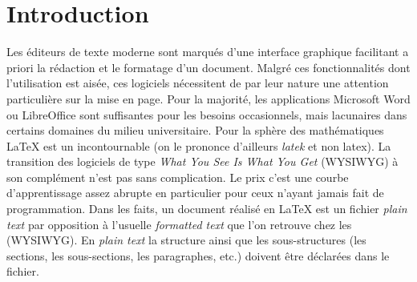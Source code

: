 \twocolumn
	\section*{Introduction}
	Les éditeurs de texte \og moderne\fg{} sont marqués d'une interface graphique facilitant a priori la rédaction et le formatage d'un document. Malgré ces fonctionnalités dont l'utilisation est aisée, ces logiciels nécessitent de par leur nature une attention particulière sur la mise en page. Pour la majorité, les applications Microsoft Word ou LibreOffice sont suffisantes pour les besoins occasionnels, mais lacunaires dans certains domaines du milieu universitaire. Pour la sphère des mathématiques \LaTeX{} est un incontournable (on le prononce d'ailleurs \og \textit{latek}\fg{} et non latex). La transition des logiciels de type \emph{What You See Is What You Get} (WYSIWYG) à son complément n'est pas sans complication. Le prix c'est une courbe d'apprentissage assez abrupte en particulier pour ceux n'ayant jamais fait de programmation. Dans les faits, un document réalisé en \LaTeX{} est un fichier \emph{plain text} par opposition à l'usuelle \emph{formatted text} que l'on retrouve chez les (WYSIWYG). En \emph{plain text} la structure ainsi que les sous-structures (les sections, les sous-sections, les paragraphes, etc.) doivent être déclarées dans le fichier.	
